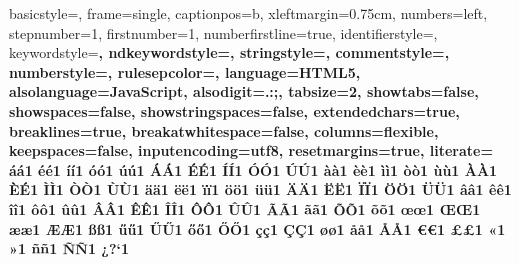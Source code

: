  {%
  basicstyle={\tiny\ttfamily},   
  frame=single,
  captionpos=b,
  xleftmargin={0.75cm},
  numbers=left,
  stepnumber=1,
  firstnumber=1,
  numberfirstline=true,	
  identifierstyle=\color{black},
  keywordstyle=\color{blue}\bfseries,
  ndkeywordstyle=\color{editorGreen}\bfseries,
  stringstyle=\color{editorOcher}\ttfamily,
  commentstyle=\color{brown}\ttfamily,
  numberstyle=\color{Gray},
  rulesepcolor=\color{lightgray},
  language=HTML5,
  alsolanguage=JavaScript,
  alsodigit={.:;},	
  tabsize=2,
  showtabs=false,
  showspaces=false,
  showstringspaces=false,
  extendedchars=true,
  breaklines=true,
  breakatwhitespace=false,
  columns=flexible,
  keepspaces=false,
  inputencoding=utf8,
  resetmargins=true,
  literate=
  {á}{{\'a}}1 {é}{{\'e}}1 {í}{{\'i}}1 {ó}{{\'o}}1 {ú}{{\'u}}1
  {Á}{{\'A}}1 {É}{{\'E}}1 {Í}{{\'I}}1 {Ó}{{\'O}}1 {Ú}{{\'U}}1
  {à}{{\`a}}1 {è}{{\`e}}1 {ì}{{\`i}}1 {ò}{{\`o}}1 {ù}{{\`u}}1
  {À}{{\`A}}1 {È}{{\'E}}1 {Ì}{{\`I}}1 {Ò}{{\`O}}1 {Ù}{{\`U}}1
  {ä}{{\"a}}1 {ë}{{\"e}}1 {ï}{{\"i}}1 {ö}{{\"o}}1 {ü}{{\"u}}1
  {Ä}{{\"A}}1 {Ë}{{\"E}}1 {Ï}{{\"I}}1 {Ö}{{\"O}}1 {Ü}{{\"U}}1
  {â}{{\^a}}1 {ê}{{\^e}}1 {î}{{\^i}}1 {ô}{{\^o}}1 {û}{{\^u}}1
  {Â}{{\^A}}1 {Ê}{{\^E}}1 {Î}{{\^I}}1 {Ô}{{\^O}}1 {Û}{{\^U}}1
  {Ã}{{\~A}}1 {ã}{{\~a}}1 {Õ}{{\~O}}1 {õ}{{\~o}}1
  {œ}{{\oe}}1 {Œ}{{\OE}}1 {æ}{{\ae}}1 {Æ}{{\AE}}1 {ß}{{\ss}}1
  {ű}{{\H{u}}}1 {Ű}{{\H{U}}}1 {ő}{{\H{o}}}1 {Ő}{{\H{O}}}1
  {ç}{{\c c}}1 {Ç}{{\c C}}1 {ø}{{\o}}1 {å}{{\r a}}1 {Å}{{\r A}}1
  {€}{{\euro}}1 {£}{{\pounds}}1 {«}{{\guillemotleft}}1
  {»}{{\guillemotright}}1 {ñ}{{\~n}}1 {Ñ}{{\~N}}1 {¿}{{?`}}1
}

\lstset{
}

\lstset{basicstyle=\ttfamily}


\usepackage[
	format=plain,
	margin=0.5cm,
	labelformat=simple,
	labelfont={bf},
	font=footnotesize,
	justification=centering
]{caption}
\usepackage{chngcntr}

